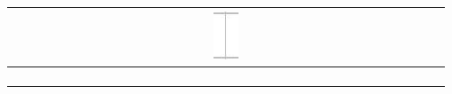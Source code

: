 \documentclass[10pt]{article}
\begin{document}
\begin{center}
\begin{tabular}{|c|c|c|c|c|c|c|c|c|c|c|c|c|c|c|c|c|c|c|c|c|c|c|c|c|c|c|c|c|c|c|c|c|}
 &  &  &  &  &  &  &  &  &  &  &  &  &  &  &  & \includegraphics[max width=\textwidth]{2024_11_21_e19607c15353cb4d7e48g-15}
 &  &  &  &  &  &  &  &  &  &  &  &  &  &  &  &  \\
\hline
 &  &  &  &  &  &  &  &  &  &  &  &  &  &  &  &  &  &  &  &  &  &  &  &  &  &  &  &  &  &  &  &  \\
\hline
 &  &  &  &  &  &  &  &  &  &  &  &  &  &  &  &  &  &  &  &  &  &  &  &  &  &  &  &  &  &  &  &  \\
\hline
 &  &  &  &  &  &  &  &  &  &  &  &  &  &  &  &  &  &  &  &  &  &  &  &  &  &  &  &  &  &  &  &  \\
\hline
 &  &  &  &  &  &  &  &  &  &  &  &  &  &  &  &  &  &  &  &  &  &  &  &  &  &  &  &  &  &  &  &  \\
\hline
\end{tabular}
\end{center}
\end{document}
